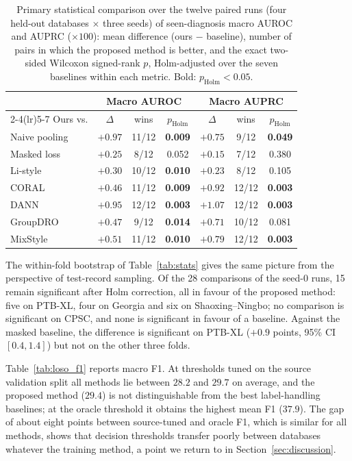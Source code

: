 \begin{table}[!htbp]
\centering\footnotesize
\setlength{\tabcolsep}{4pt}
\caption{Primary statistical comparison over the twelve paired runs (four held-out databases $\times$ three seeds) of seen-diagnosis macro AUROC and AUPRC ($\times100$): mean difference (ours $-$ baseline), number of pairs in which the proposed method is better, and the exact two-sided Wilcoxon signed-rank $p$, Holm-adjusted over the seven baselines within each metric. Bold: $p_{\mathrm{Holm}}<0.05$.}\label{tab:seedstats}
\begin{tabular}{lcccccc}
\toprule
 & \multicolumn{3}{c}{Macro AUROC} & \multicolumn{3}{c}{Macro AUPRC} \\
\cmidrule(lr){2-4}\cmidrule(lr){5-7}
Ours vs. & $\Delta$ & wins & $p_{\mathrm{Holm}}$ & $\Delta$ & wins & $p_{\mathrm{Holm}}$ \\
\midrule
Naive pooling & $+0.97$ & 11/12 & \textbf{0.009} & $+0.75$ & 9/12 & \textbf{0.049} \\
Masked loss & $+0.25$ & 8/12 & 0.052 & $+0.15$ & 7/12 & 0.380 \\
Li-style & $+0.30$ & 10/12 & \textbf{0.010} & $+0.23$ & 8/12 & 0.105 \\
CORAL & $+0.46$ & 11/12 & \textbf{0.009} & $+0.92$ & 12/12 & \textbf{0.003} \\
DANN & $+0.95$ & 12/12 & \textbf{0.003} & $+1.07$ & 12/12 & \textbf{0.003} \\
GroupDRO & $+0.47$ & 9/12 & \textbf{0.014} & $+0.71$ & 10/12 & 0.081 \\
MixStyle & $+0.51$ & 11/12 & \textbf{0.010} & $+0.79$ & 12/12 & \textbf{0.003} \\
\bottomrule
\end{tabular}
\end{table}

The within-fold bootstrap of Table~\ref{tab:stats} gives the same picture from the perspective of test-record sampling. Of the 28 comparisons of the seed-0 runs, 15 remain significant after Holm correction, all in favour of the proposed method: five on PTB-XL, four on Georgia and six on Shaoxing--Ningbo; no comparison is significant on CPSC, and none is significant in favour of a baseline. Against the masked baseline, the difference is significant on PTB-XL ($+0.9$ points, 95\% CI $[0.4,1.4]$) but not on the other three folds.


Table~\ref{tab:loso_f1} reports macro F1. At thresholds tuned on the source validation split all methods lie between $28.2$ and $29.7$ on average, and the proposed method ($29.4$) is not distinguishable from the best label-handling baselines; at the oracle threshold it obtains the highest mean F1 ($37.9$). The gap of about eight points between source-tuned and oracle F1, which is similar for all methods, shows that decision thresholds transfer poorly between databases whatever the training method, a point we return to in Section~\ref{sec:discussion}.

